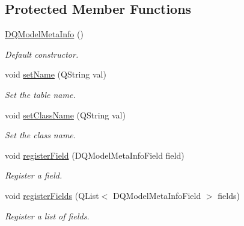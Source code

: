 \subsection*{Protected Member Functions}
\begin{DoxyCompactItemize}
\item 
\hypertarget{classDQModelMetaInfo_a90b116be8bca86508675f40e8ba72ba6}{
\hyperlink{classDQModelMetaInfo_a90b116be8bca86508675f40e8ba72ba6}{DQModelMetaInfo} ()}
\label{classDQModelMetaInfo_a90b116be8bca86508675f40e8ba72ba6}

\begin{DoxyCompactList}\small\item\em Default constructor. \item\end{DoxyCompactList}\item 
\hypertarget{classDQModelMetaInfo_a6408024aed561357cb6a88a369c08ac0}{
void \hyperlink{classDQModelMetaInfo_a6408024aed561357cb6a88a369c08ac0}{setName} (QString val)}
\label{classDQModelMetaInfo_a6408024aed561357cb6a88a369c08ac0}

\begin{DoxyCompactList}\small\item\em Set the table name. \item\end{DoxyCompactList}\item 
\hypertarget{classDQModelMetaInfo_a223e06129199041e6ff7a40600705f29}{
void \hyperlink{classDQModelMetaInfo_a223e06129199041e6ff7a40600705f29}{setClassName} (QString val)}
\label{classDQModelMetaInfo_a223e06129199041e6ff7a40600705f29}

\begin{DoxyCompactList}\small\item\em Set the class name. \item\end{DoxyCompactList}\item 
\hypertarget{classDQModelMetaInfo_ad45d5a938b17f8fdf7f10d1cf53d2300}{
void \hyperlink{classDQModelMetaInfo_ad45d5a938b17f8fdf7f10d1cf53d2300}{registerField} (DQModelMetaInfoField field)}
\label{classDQModelMetaInfo_ad45d5a938b17f8fdf7f10d1cf53d2300}

\begin{DoxyCompactList}\small\item\em Register a field. \item\end{DoxyCompactList}\item 
\hypertarget{classDQModelMetaInfo_a9c6441c65e9509b61bd54a619d15e7ba}{
void \hyperlink{classDQModelMetaInfo_a9c6441c65e9509b61bd54a619d15e7ba}{registerFields} (QList$<$ DQModelMetaInfoField $>$ fields)}
\label{classDQModelMetaInfo_a9c6441c65e9509b61bd54a619d15e7ba}

\begin{DoxyCompactList}\small\item\em Register a list of fields. \item\end{DoxyCompactList}\end{DoxyCompactItemize}
